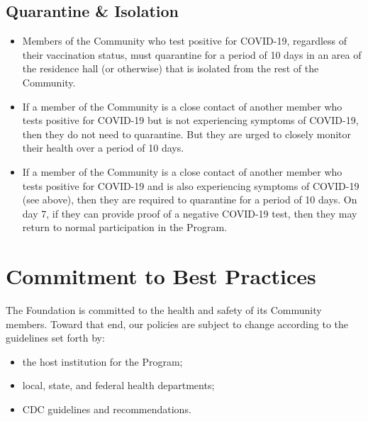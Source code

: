 \documentclass{ross}
\begin{document}
\subsection*{Quarantine \& Isolation}

\begin{itemize}
    \item Members of the Community who test positive for COVID-19, regardless of their vaccination status, must quarantine for a period of 10 days in an area of the residence hall (or otherwise) that is isolated from the rest of the Community. 
    \item If a member of the Community is a close contact of another member who tests positive for COVID-19 but is not experiencing symptoms of COVID-19, then they do not need to quarantine. But they are urged to closely monitor their health over a period of 10 days.
    \item If a member of the Community is a close contact of another member who tests positive for COVID-19 and is also experiencing symptoms of COVID-19 (see above), then they are required to quarantine for a period of 10 days. On day 7, if they can provide proof of a negative COVID-19 test, then they may return to normal participation in the Program.
\end{itemize}

\section*{Commitment to Best Practices}

The Foundation is committed to the health and safety of its Community members. Toward that end, our policies are subject to change according to the guidelines set forth by:
\begin{itemize}
    \item the host institution for the Program;
    \item local, state, and federal health departments; 
    \item CDC guidelines and recommendations. 
\end{itemize}
\end{document}
